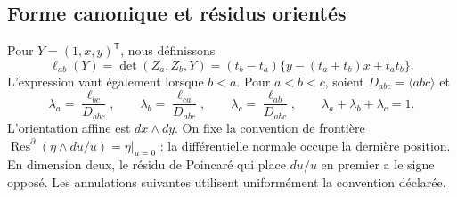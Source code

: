 \subsection{Forme canonique et résidus orientés}

Pour \(Y=(1,x,y)^\mathsf T\), nous définissons
\begin{equation}
 \ell_{ab}(Y)=\det(Z_a,Z_b,Y)
 =(t_b-t_a)\{y-(t_a+t_b)x+t_at_b\}.
 \label{eq:polygon-lines}
\end{equation}
L’expression vaut également lorsque \(b<a\). Pour \(a<b<c\), soient
\(D_{abc}=\langle abc\rangle\) et
\begin{equation}
 \lambda_a=\frac{\ell_{bc}}{D_{abc}},\qquad
 \lambda_b=\frac{\ell_{ca}}{D_{abc}},\qquad
 \lambda_c=\frac{\ell_{ab}}{D_{abc}},\qquad
 \lambda_a+\lambda_b+\lambda_c=1.
 \label{eq:polygon-barycentric}
\end{equation}
L’orientation affine est \(dx\wedge dy\). On fixe la convention de frontière
\(\operatorname{Res}^{\partial}(\eta\wedge du/u)=\eta|_{u=0}\) :
la différentielle normale occupe la dernière position. En dimension deux, le
résidu de Poincaré qui place \(du/u\) en premier a le signe opposé.
Les annulations suivantes utilisent uniformément la convention déclarée.

